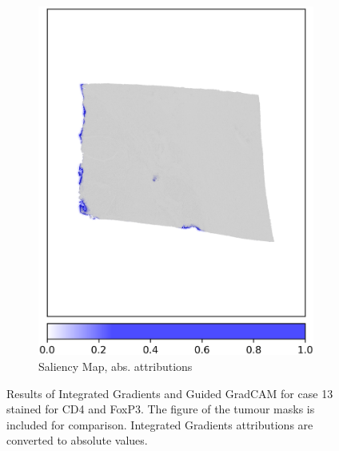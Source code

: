 \begin{figure}[h!t]
\begin{subfigure}[b]{0.49\textwidth}
         \includegraphics[width=\textwidth]{latex/captum/case13b/saliency_case13-stain42-dead_2415days.png}
         \caption{Saliency Map, abs. attributions}
     \end{subfigure}
    \hfill
    \caption[Integrated gradients, Guided GradCAM and saliency for case 13 stain 42]{Results of Integrated Gradients and Guided GradCAM for case 13 stained for CD4 and FoxP3. The figure of the tumour masks is included for comparison. Integrated Gradients attributions are converted to absolute values.}
    \label{fig:case13c}
\end{figure}


